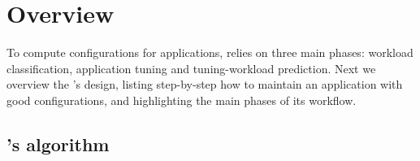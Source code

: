 \section{\name Overview}

To compute configurations for applications, \name relies on three main phases:
workload classification, application tuning and tuning-workload prediction. Next
we overview the \name's design, listing step-by-step how to maintain an
application with good configurations, and highlighting the main phases of its
workflow.

\subsection{\name's algorithm}


